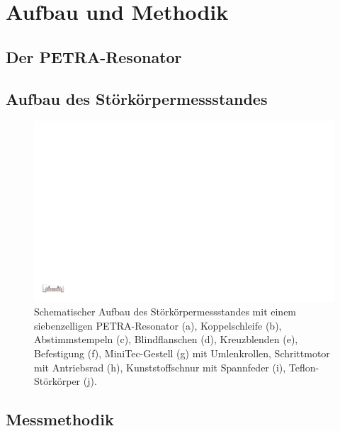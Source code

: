 \chapter{Aufbau und Methodik}
\label{sec:aufbau_und_methodik}


\section{Der PETRA-Resonator}


\section{Aufbau des Störkörpermessstandes}
\begin{figure}
	\centering
	\includegraphics[width=1.0\textheight]{./figs/cavity/messaufbau.pdf}
	\caption{Schematischer Aufbau des Störkörpermessstandes mit einem siebenzelligen PETRA-Resonator (a),  Koppelschleife (b), Abstimmstempeln (c), Blindflanschen (d), Kreuzblenden (e), Befestigung (f), MiniTec-Gestell (g) mit Umlenkrollen, Schrittmotor mit Antriebsrad (h), Kunststoffschnur mit Spannfeder (i), Teflon-Störkörper (j).}
\end{figure}

\section{Messmethodik}
